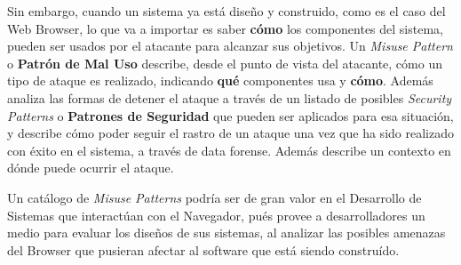 Sin embargo, cuando un sistema ya está diseño y construido, como es el caso del Web Browser, lo que va a importar es saber \textbf{cómo} los componentes del sistema, pueden ser usados por el atacante para alcanzar sus objetivos. Un \textit{Misuse Pattern} o \textbf{Patrón de Mal Uso} describe, desde el punto de vista del atacante, cómo un tipo de ataque es realizado, indicando \textbf{qué} componentes usa y \textbf{cómo}. Además analiza las formas de detener el ataque a través de un listado de posibles \textit{Security Patterns} o \textbf{Patrones de Seguridad} que pueden ser aplicados para esa situación, y describe cómo poder seguir el rastro de un ataque una vez que ha sido realizado con éxito en el sistema, a través de data forense. Además describe un contexto en dónde puede ocurrir el ataque.

Un catálogo de \textit{Misuse Patterns} podría ser de gran valor en el Desarrollo de Sistemas que interactúan con el Navegador, pués provee a desarrolladores un medio para evaluar los diseños de sus sistemas, al analizar las posibles amenazas del Browser que pusieran afectar al software que está siendo construído.
